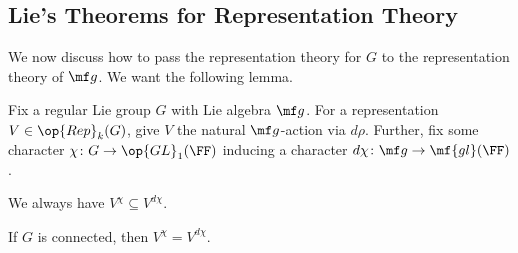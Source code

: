 \documentclass[../notes.tex]{subfiles}
\begin{document}
\subsection{Lie's Theorems for Representation Theory}
We now discuss how to pass the representation theory for $G$ to the representation theory of $\mf g$. We want the following lemma.
\begin{lemma}
	Fix a regular Lie group $G$ with Lie algebra $\mf g$. For a representation $V\in\op{Rep}_k(G)$, give $V$ the natural $\mf g$-action via $d\rho$. Further, fix some character $\chi\colon G\to\op{GL}_1(\FF)$ inducing a character $d\chi\colon\mf g\to\mf{gl}(\FF)$.
	\begin{listalph}
		\item We always have $V^\chi\subseteq V^{d\chi}$.
		\item If $G$ is connected, then $V^\chi=V^{d\chi}$.
	\end{listalph}
\end{lemma}
\end{document}
